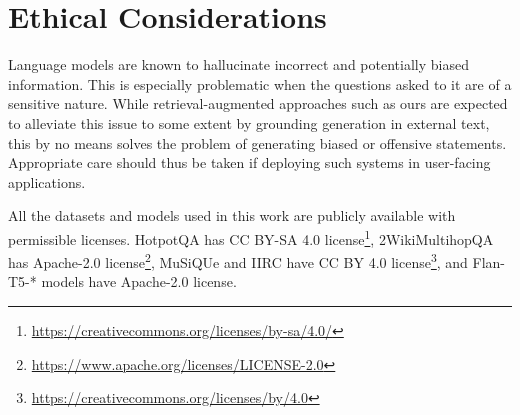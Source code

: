 \section*{Ethical Considerations}

Language models are known to hallucinate incorrect and potentially biased information. This is especially problematic when the questions asked to it are of a sensitive nature. While retrieval-augmented approaches such as ours are expected to alleviate this issue to some extent by grounding generation in external text, this by no means solves the problem of generating biased or offensive statements. Appropriate care should thus be taken if deploying such systems in user-facing applications.

All the datasets and models used in this work are publicly available with permissible licenses. HotpotQA has CC BY-SA 4.0 license\footnote{\url{https://creativecommons.org/licenses/by-sa/4.0/}}, 2WikiMultihopQA has Apache-2.0 license\footnote{\url{https://www.apache.org/licenses/LICENSE-2.0}}, MuSiQUe and IIRC have CC BY 4.0 license\footnote{\url{https://creativecommons.org/licenses/by/4.0}}, and Flan-T5-* models have Apache-2.0 license.